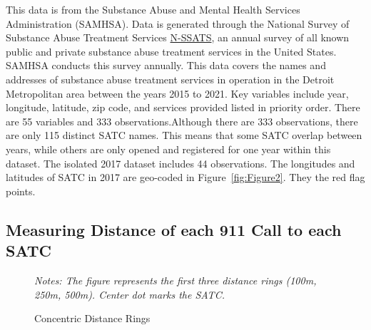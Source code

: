 \documentclass[12pt]{article}
\begin{document}
This data is from the Substance Abuse and Mental Health Services Administration (SAMHSA). Data is generated through the National Survey of Substance Abuse Treatment Services \href{https://www.samhsa.gov/data/data-we-collect/n-ssats-national-survey-substance-abuse-treatment-services}{N-SSATS}, an annual survey of all known public and private substance abuse treatment services in the United States. SAMHSA conducts this survey annually.  This data covers the names and addresses of substance abuse treatment services in operation in the Detroit Metropolitan area between the years 2015 to 2021. Key variables include year, longitude, latitude, zip code, and services provided listed in priority order. There are 55 variables and 333 observations.\footnotemark[1]Although there are 333 observations, there are only 115 distinct SATC names. This means that some SATC overlap between years, while others are only opened and registered for one year within this dataset. The isolated 2017 dataset includes 44 observations. The longitudes and latitudes of SATC in 2017 are geo-coded in Figure~\ref{fig:Figure2}. They the red flag points. 


\subsection{Measuring Distance of each 911 Call to each SATC}
 


\begin{figure} 
\caption{Concentric Distance Rings}
\label{fig:Figure1}
\small\textit{Notes: The figure represents the first three distance rings (100m, 250m, 500m). Center dot marks the SATC.}
\end{figure}
\end{document}
